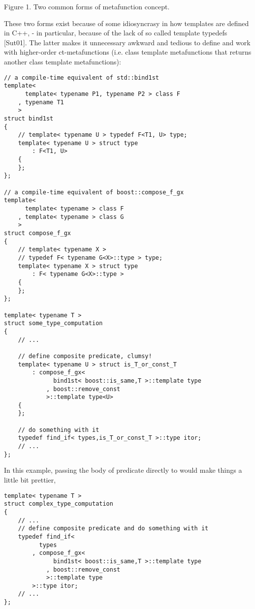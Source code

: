 \documentclass{netobjectdays}
\begin{document}
Figure 1. Two common forms of metafunction concept.


These two forms exist because of some idiosyncrasy in 
how templates are defined in C++, - in particular, because 
of the lack of so called template typedefs [Sut01]. The 
latter makes it unnecessary awkward and tedious to define 
and work with higher-order ct-metafunctions (i.e. class 
template metafunctions that returns another class template 
metafunctions):


{\footnotesize
\begin{verbatim}
// a compile-time equivalent of std::bind1st
template<
      template< typename P1, typename P2 > class F
    , typename T1
    >
struct bind1st
{
    // template< typename U > typedef F<T1, U> type;
    template< typename U > struct type
        : F<T1, U>
    {
    };
};

// a compile-time equivalent of boost::compose_f_gx
template<
      template< typename > class F
    , template< typename > class G
    >
struct compose_f_gx
{
    // template< typename X > 
    // typedef F< typename G<X>::type > type;
    template< typename X > struct type
        : F< typename G<X>::type >
    {
    };
};

template< typename T >
struct some_type_computation
{
    // ...

    // define composite predicate, clumsy!
    template< typename U > struct is_T_or_const_T
        : compose_f_gx<
              bind1st< boost::is_same,T >::template type
            , boost::remove_const
            >::template type<U>
    {
    };

    // do something with it
    typedef find_if< types,is_T_or_const_T >::type itor;
    // ...
};
\end{verbatim}
}


In this example, passing the body of 
 predicate directly to 
 would make things a little bit prettier, 


{\footnotesize
\begin{verbatim}
template< typename T >
struct complex_type_computation
{
    // ...
    // define composite predicate and do something with it
    typedef find_if<
          types
        , compose_f_gx<
              bind1st< boost::is_same,T >::template type
            , boost::remove_const
            >::template type
        >::type itor;
    // ...
};
\end{verbatim}
}
\end{document}
